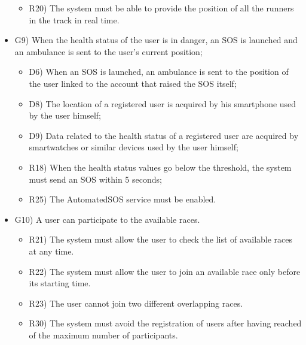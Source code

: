 \documentclass{article}
\begin{document}
\begin{legal}
\begin{legal}
\begin{legal}
\begin{itemize}
{\begin{itemize}
					\item R20) The system must be able to provide the position of all the runners in the track in real time.\\
					\end{itemize}
				}
				\item G9) When the health status of the user is in danger, an SOS is launched and an ambulance is sent to the user’s current position;\\
				{\normalfont
					\begin{itemize}
					\item D6) When an SOS is launched, an ambulance is sent to the position of the user linked to the account that raised the SOS itself;\\
					\item D8) The location of a registered user is acquired by his smartphone used by the user himself;\\
	 				\item D9) Data related to the health status of a registered user are acquired by smartwatches or similar devices used by the user himself;\\
					\item R18) When the health status values go below the threshold, the system must send an SOS within 5 seconds;\\
	 				\item R25) The AutomatedSOS service must be enabled.\\
					\end{itemize}
				}
				\item G10) A user can participate to the available races. \\
				{\normalfont
					\begin{itemize}
					\item R21) The system must allow the user to check the list of available races at any time.\\
					\item R22) The system must allow the user to join an available race only before its starting time.\\
	 				\item R23) The user cannot join two different overlapping races.\\
					\item R30) The system must avoid the registration of users after having reached of the maximum number of participants.\\
					\end{itemize}
}
\end{itemize}
\end{legal}
\end{legal}
\end{legal}
\end{document}
